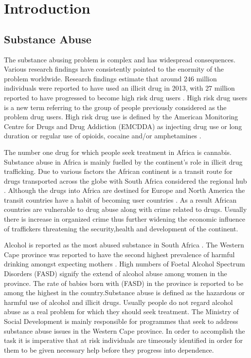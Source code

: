 \chapter{Introduction}



\section{Substance Abuse}
 
The substance abusing problem is complex and has widespread consequences. Various research findings have consistently pointed to the enormity of the problem worldwide. Research findings estimate that around $246$ million individuals were reported to have used an illicit drug in 2013, with $27$ million  reported to have progressed to become high risk drug users \cite{unodc2015}. High risk drug users is a new term referring to the group of people previously considered as the problem drug users. High risk drug use is defined by the American Monitoring Centre for Drugs and Drug Addiction (EMCDDA) as injecting drug use or long duration or regular use of opioids, cocaine and/or amphetamines \cite{EMCDA}.

The number one drug for which people seek treatment in Africa is cannabis. Substance abuse  in Africa is mainly fuelled  by the continent's role in illicit drug trafficking. Due to various factors the African continent is a transit route for drugs transported across the globe with South Africa considered the regional hub \cite{unodc2015}. Although the drugs into Africa are destined for Europe and North America the transit countries have a habit of becoming user countries \cite{segell1998stability}. As a result African countries are vulnerable to drug abuse along with crime related to drugs. Usually there is increase in organized crime thus further widening the  economic influence of traffickers threatening the security,health and development of the continent.
 
 Alcohol is reported as the most abused substance in South Africa \cite{parry1998substance}. The Western Cape province was reported to have the second highest prevalence of harmful drinking amongst expecting mothers \cite{harker2008substance} . High numbers of Foetal Alcohol Spectrum Disorders (FASD) signify the extend of alcohol abuse among women in the province. The rate of babies born with (FASD) in the province is reported to be among the highest in the country.Substance abuse is defined as the hazardous or harmful use of alcohol and  illicit drugs. Usually  people do not regard alcohol abuse as a real problem for which they should seek treatment. The Ministry of Social Development is mainly responsible for programmes that seek to address substance abuse issues in the Western Cape province. In order to accomplish the task it is imperative that at risk individuals are timeously identified in order for them to be given necessary help before they progress into dependence. 


